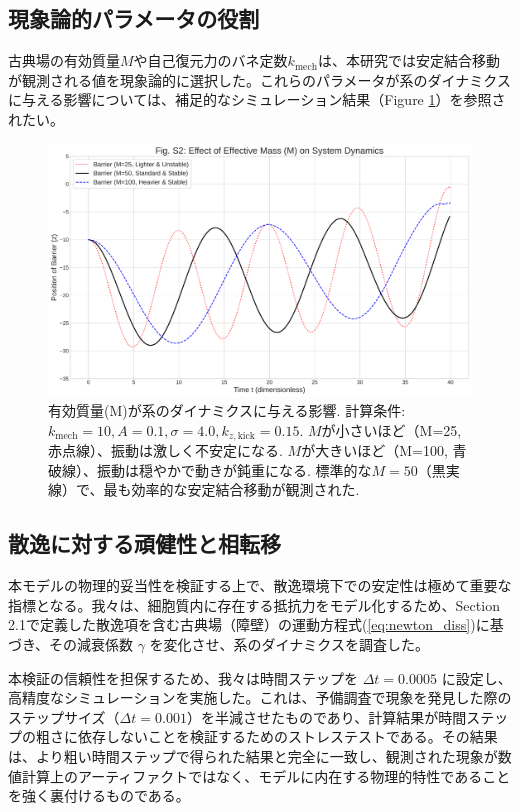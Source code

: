 \documentclass[a4paper,11pt,ja=standard]{bxjsarticle}
\begin{document}
\subsection{現象論的パラメータの役割}
古典場の有効質量$M$や自己復元力のバネ定数$k_{\text{mech}}$は、本研究では安定結合移動が観測される値を現象論的に選択した。これらのパラメータが系のダイナミクスに与える影響については、補足的なシミュレーション結果（Figure \ref{fig:mass_effect}）を参照されたい。

\begin{figure}[h!]
  \centering
  \includegraphics[width=0.9\linewidth]{fig2_mass_effect.pdf}
  \caption{有効質量(M)が系のダイナミクスに与える影響. 計算条件: $k_{\text{mech}}=10, A=0.1, \sigma=4.0, k_{z,\text{kick}}=0.15$. $M$が小さいほど（M=25, 赤点線）、振動は激しく不安定になる. $M$が大きいほど（M=100, 青破線）、振動は穏やかで動きが鈍重になる. 標準的な$M=50$（黒実線）で、最も効率的な安定結合移動が観測された.}
  \label{fig:mass_effect}
\end{figure}

\subsection{散逸に対する頑健性と相転移}
本モデルの物理的妥当性を検証する上で、散逸環境下での安定性は極めて重要な指標となる。我々は、細胞質内に存在する抵抗力をモデル化するため、Section 2.1で定義した散逸項を含む古典場（障壁）の運動方程式(\ref{eq:newton_diss})に基づき、その減衰係数 $\gamma$ を変化させ、系のダイナミクスを調査した。

本検証の信頼性を担保するため、我々は時間ステップを $\Delta t = 0.0005$ に設定し、高精度なシミュレーションを実施した。これは、予備調査で現象を発見した際のステップサイズ（$\Delta t = 0.001$）を半減させたものであり、計算結果が時間ステップの粗さに依存しないことを検証するためのストレステストである。その結果は、より粗い時間ステップで得られた結果と完全に一致し、観測された現象が数値計算上のアーティファクトではなく、モデルに内在する物理的特性であることを強く裏付けるものである。
\end{document}
